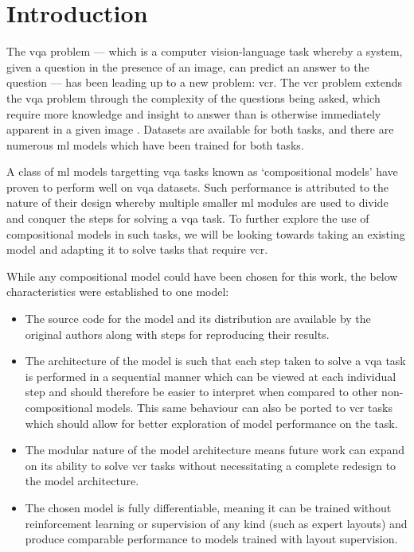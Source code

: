 \chapter{Introduction}
\label{chp:introduction}

The \acrlong{vqa} problem --- which is a computer vision-language task whereby a system, given a question in the presence of an image, can predict an answer to the question \cite{agrawal_vqa_2016} --- has been leading up to a new problem: \acrfull{vcr}.
The \acrshort{vcr} problem extends the \acrshort{vqa} problem through the complexity of the questions being asked, which require more knowledge and insight to answer than is otherwise immediately apparent in a given image \cite{zellers_recognition_2019}.
Datasets are available for both tasks, and there are numerous \gls{ml} models which have been trained for both tasks.

A class of \gls{ml} models targetting \gls{vqa} tasks known as `compositional models'\cite{andreas_neural_2016} have proven to perform well on \gls{vqa} datasets\cite{fishandi_neural_2023}.
Such performance is attributed to the nature of their design whereby multiple smaller \gls{ml} modules are used to divide and conquer the steps for solving a \gls{vqa} task.
To further explore the use of compositional models in such tasks, we will be looking towards taking an existing model and adapting it to solve tasks that require \gls{vcr}.

While any compositional model could have been chosen for this work, the below characteristics were established to one model:

\begin{itemize}\label{list:reasons_for_nmn}
    \item The source code for the model and its distribution are available by the original authors along with steps for reproducing their results.
    \item The architecture of the model is such that each step taken to solve a \gls{vqa} task is performed in a sequential manner which can be viewed at each individual step and should therefore be easier to interpret when compared to other non-compositional models.
          This same behaviour can also be ported to \gls{vcr} tasks which should allow for better exploration of model performance on the task.
    \item The modular nature of the model architecture means future work can expand on its ability to solve \gls{vcr} tasks without necessitating a complete redesign to the model architecture.
    \item The chosen model is fully differentiable, meaning it can be trained without reinforcement learning or supervision of any kind (such as expert layouts) and produce comparable performance to models trained with layout supervision.
\end{itemize}

